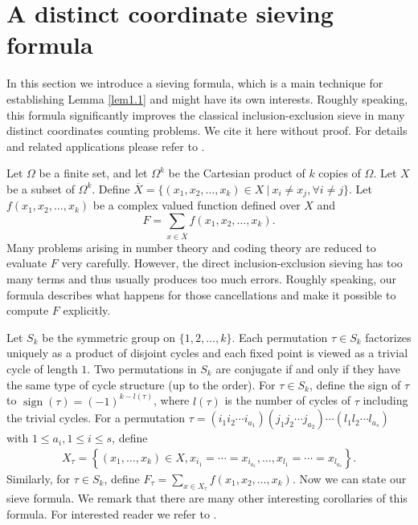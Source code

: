 \documentclass[reqno]{amsart}
\theoremstyle{remark}
\numberwithin{equation}{section}
\DeclareMathOperator{\sign}{sign}
\begin{document}
\section{A distinct coordinate sieving formula}
In this section we introduce a sieving formula, which is a main technique for establishing Lemma \ref{lem1.1} and might have its own interests.
Roughly speaking, this formula significantly improves the classical
inclusion-exclusion sieve in many distinct coordinates counting
problems. We cite it here without proof. For details and related
applications please refer to \cite{LW2, LW3}.

Let $\Omega$ be a finite set, and let $\Omega^k$ be the Cartesian
product of $k$ copies of $\Omega$. Let $X$ be a
subset of $\Omega^k$. %
Define $\overline{X}=\{(x_1,x_2,\ldots,x_k)\in X \ | \ x_i\ne x_j,
\forall i\ne j\}.$
Let $f(x_1,x_2,\dots,x_k)$ be a complex valued function defined over
$X$ and
$$F=\sum_{x \in \overline{X}}f(x_1,x_2,\dots,x_k).\label{1.00}$$
Many problems arising in number theory and coding theory are reduced to evaluate $F$ very carefully. However, the direct inclusion-exclusion
sieving has too many terms and thus usually produces too much errors.
Roughly speaking, our formula describes what happens for those cancellations and make it possible to compute $F$ explicitly.

 Let $S_k$ be the symmetric group on $\{1,2,\ldots, k\}$.
Each permutation $\tau\in S_k$ factorizes uniquely %
as a product of disjoint cycles and  each
  fixed point is viewed as a trivial cycle of length $1$.
   Two permutations in $S_k$ are conjugate if and only if they
have the same type of cycle structure (up to the order).
 For $\tau\in S_k$, define the sign of $\tau$ to
  $\sign(\tau)=(-1)^{k-l(\tau)}$, where $l(\tau)$ is the number of
 cycles of $\tau$ including the trivial cycles.
 For a permutation $\tau=(i_1i_2\cdots i_{a_1})
  (j_1j_2\cdots j_{a_2})\cdots(l_1l_2\cdots l_{a_s})$
  with $1\leq a_i, 1 \leq i\leq s$, define
  \hskip 1.0cm
  \begin{align} \label{1.1}
     X_{\tau}=\left\{
(x_1,\dots,x_k)\in X,
 x_{i_1}=\cdots=x_{i_{a_1}},\ldots, x_{l_1}=\cdots=x_{l_{a_s}}
 \right\}.
\end{align}
 Similarly, for $\tau \in S_k$,  define $F_{\tau}=\sum_{x \in
X_{\tau} } f(x_1,x_2,\dots,x_k). $ Now we can state our sieve
formula.   We remark that there are many other interesting
corollaries of this formula. For interested reader we refer to
\cite{LW2}.
\end{document}
